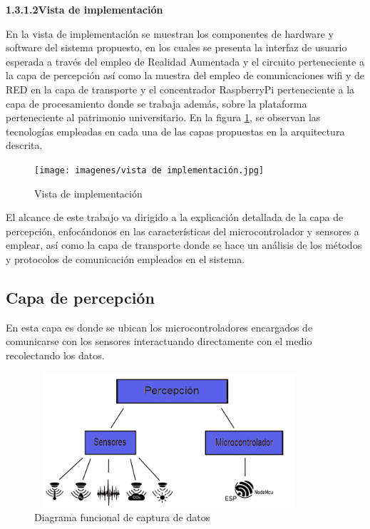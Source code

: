         \textbf{1.3.1.2\hspace{5mm}Vista de implementación}

    En la vista de implementación se muestran los componentes de hardware y software del sistema propuesto, en los cuales se presenta la interfaz de usuario esperada a través del empleo de Realidad Aumentada y el circuito perteneciente a la capa de percepción
    así como la muestra del empleo de comunicaciones wifi y de RED en la capa de transporte y el concentrador RaspberryPi perteneciente a la capa de procesamiento donde se trabaja además, sobre la plataforma perteneciente al patrimonio universitario.
    En la figura \ref{imag:vista_implementacion_arquitectura_iot}, se observan las tecnologías empleadas en cada una de las capas propuestas en la arquitectura descrita.
    
    \begin{figure}[h]
        \centering
        \texttt{[image: imagenes/vista de implementación.jpg]}
        \caption{Vista de implementación}
        \label{imag:vista_implementacion_arquitectura_iot}
    \end{figure}

    El alcance de este trabajo va dirigido a la explicación detallada de la capa de percepción, enfocándonos en las características del microcontrolador y sensores a emplear, así como la capa de transporte donde se hace un análisis de los métodos y protocolos de comunicación empleados en el sistema.

    \subsection{Capa de percepción}\label{subsec:capa_percepcion}
    En esta capa es donde se ubican los microcontroladores encargados de comunicarse con los sensores interactuando directamente con el medio recolectando los datos.\\
    
    \begin{figure}[h]
        \centering
        \includegraphics[width=10cm, height=5cm]{imagenes/perception_image.jpg}
        \caption{Diagrama funcional de captura de datos}
        \label{imag:capa_percepcion}
    \end{figure}

